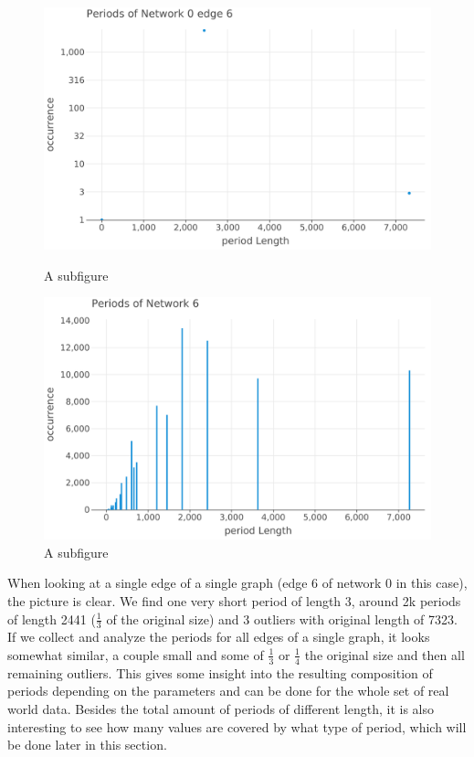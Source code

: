 \begin{figure}[!htb]
	\centering
	\begin{minipage}{.5\textwidth}
		\centering
		\includegraphics[width=\linewidth]{charts/introduction/test-edge-plot-log.png}
		\caption{A subfigure}
		\label{fig:intro-edge-plot}
	\end{minipage}%
	\begin{minipage}{0.5\textwidth}
		\centering
		\includegraphics[width=\linewidth]{charts/introduction/test-graph-plot.png}
		\caption{A subfigure}
		\label{fig:intro-graph-plot}
	\end{minipage}
\end{figure}

When looking at a single edge of a single graph (edge 6 of network 0 in this case), the picture is clear. We find one very short period of length 3, around 2k periods of length 2441 ($\frac{1}{3}$ of the original size) and 3 outliers with original length of 7323. If we collect and analyze the periods for all edges of a single graph, it looks somewhat similar, a couple small and some of $\frac{1}{3}$ or $\frac{1}{4}$ the original size and then all remaining outliers.  This gives some insight into the resulting composition of periods depending on the parameters and can be done for the whole set of real world data. Besides the total amount of periods of different length, it is also interesting to see how many values are covered by what type of period, which will be done later in this section.

